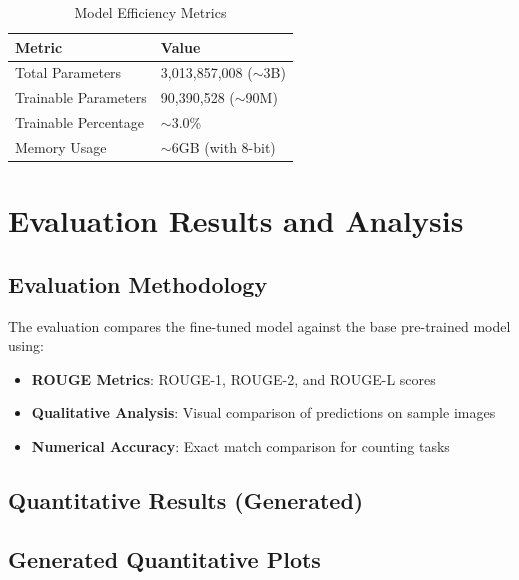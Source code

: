 \documentclass[conference]{IEEEtran}
\begin{document}
\begin{table}[t]
\centering
\caption{Model Efficiency Metrics}
\begin{tabular}{l|l}
\toprule
Metric & Value \\
\midrule
Total Parameters & 3,013,857,008 ($\sim$3B) \\
Trainable Parameters & 90,390,528 ($\sim$90M) \\
Trainable Percentage & $\sim$3.0\% \\
Memory Usage & $\sim$6GB (with 8-bit) \\
\bottomrule
\end{tabular}
\end{table}

\section{Evaluation Results and Analysis}

\subsection{Evaluation Methodology}

The evaluation compares the fine-tuned model against the base pre-trained model using:

\begin{itemize}
    \item \textbf{ROUGE Metrics}: ROUGE-1, ROUGE-2, and ROUGE-L scores
    \item \textbf{Qualitative Analysis}: Visual comparison of predictions on sample images
    \item \textbf{Numerical Accuracy}: Exact match comparison for counting tasks
\end{itemize}

\subsection{Quantitative Results (Generated)}



\subsection{Generated Quantitative Plots}
\end{document}
